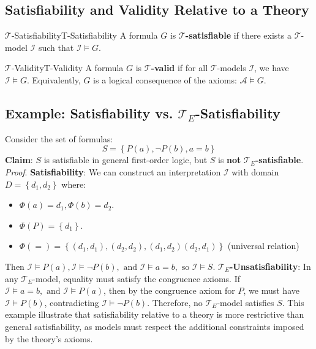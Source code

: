 \documentclass[a4paper]{article}
\theoremstyle{definition}
\begin{document}
\subsection{Satisfiability and Validity Relative to a Theory}
\begin{definition}{\( \mathcal{T} \)-Satisfiability}{T-Satisfiability}
A formula \( G \) is \( \mathcal{T} \)\textbf{-satisfiable} if there exists a \( \mathcal{T} \)-model \( \mathcal{I} \) such that 
\( \mathcal{I} \models G \).
\end{definition}
\begin{definition}{\( \mathcal{T} \)-Validity}{T-Validity}
A formula \( G \) is \( \mathcal{T} \)\textbf{-valid} if for all \( \mathcal{T} \)-models \( \mathcal{I} \), we have \( \mathcal{I} \models G \).
\vspace{1em}
\noindent
\newline
Equivalently, \( G \) is a logical consequence of the axioms: \( \mathcal{A} \models G \).
\end{definition}
\subsection{Example: Satisfiability vs. \( \mathcal{T}_{E} \)-Satisfiability}
Consider the set of formulas:
\[
  S = \left\{ P(a), \lnot P(b), a = b \right\}
\]
\textbf{Claim}: \( S \) is satisfiable in general first-order logic, but \( S \) is \textbf{not} \( \mathcal{T}_{E} \)\textbf{-satisfiable}.
\vspace{1em}
\noindent
\newline
\textit{Proof}. \textbf{Satisfiability}: We can construct an interpretation \( \mathcal{I} \) with domain \( D = \left\{ d_1, d_2 \right\} \) where:
\begin{itemize}
	\item \( \Phi(a) = d_1, \Phi(b) = d_2 \).
	\item \( \Phi(P) = \left\{d_1\right\} \).
	\item \( \Phi(=) = \left\{(d_1,d_1),(d_2,d_2),(d_1,d_2)(d_2,d_1) \right\} \) (universal relation)
\end{itemize}
Then \( \mathcal{I} \models P(a), \mathcal{I} \models \lnot P(b), \text{ and } \mathcal{I} \models a = b, \text{ so } \mathcal{I} \models S \).
\vspace{1em}
\noindent
\newline
\( \mathcal{T}_{E} \)\textbf{-Unsatisfiability}: In any \( \mathcal{T}_{E} \)-model, equality must satisfy the congruence axioms. 
If \( \mathcal{I} \models a = b, \text{ and } \mathcal{I} \models P(a) \), then by the congruence axiom for \( P \), we must have \( \mathcal{I} \models P(b) \), contradicting 
\( \mathcal{I} \models \lnot P(b) \). Therefore, no \( \mathcal{T}_{E} \)-model satisfies \( S \).
\vspace{1em}
\noindent
\newline
This example illustrate that satisfiability relative to a theory is more restrictive than general satisfiability, as models 
must respect the additional constraints imposed by the theory's axioms.
\end{document}
